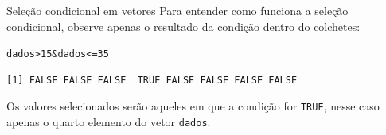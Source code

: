 \documentclass[10pt,handout]{beamer}\usepackage[]{graphicx}\usepackage[]{color}
\makeatletter
\newcommand{\hlnum}[1]{\textcolor[rgb]{0.686,0.059,0.569}{#1}}%
\newcommand{\hlopt}[1]{\textcolor[rgb]{0,0,0}{#1}}%
\newcommand{\hlstd}[1]{\textcolor[rgb]{0.345,0.345,0.345}{#1}}%
\newenvironment{kframe}{%
 \def\at@end@of@kframe{}%
 \ifinner\ifhmode%
  \def\at@end@of@kframe{\end{minipage}}%
  \begin{minipage}{\columnwidth}%
 \fi\fi%
 \def\FrameCommand##1{\hskip\@totalleftmargin \hskip-\fboxsep
 \colorbox{shadecolor}{##1}\hskip-\fboxsep
     \hskip-\linewidth \hskip-\@totalleftmargin \hskip\columnwidth}%
 \MakeFramed {\advance\hsize-\width
   \@totalleftmargin\z@ \linewidth\hsize
   \@setminipage}}%
 {\par\unskip\endMakeFramed%
 \at@end@of@kframe}
\newenvironment{knitrout}{}{} %
\makeatother
\begin{document}
\begin{frame}[fragile]{Seleção condicional em vetores}
Para entender como funciona a seleção condicional, observe apenas o
resultado da condição dentro do colchetes:
\begin{knitrout}\small
{}\color{fgcolor}\begin{kframe}
\begin{alltt}
\hlstd{dados} \hlopt{>} \hlnum{15} \hlopt{&} \hlstd{dados} \hlopt{<=} \hlnum{35}
\end{alltt}
\begin{verbatim}
[1] FALSE FALSE FALSE  TRUE FALSE FALSE FALSE FALSE
\end{verbatim}
\end{kframe}
\end{knitrout}

Os valores selecionados serão aqueles em que a condição for
\texttt{TRUE}, nesse caso apenas o quarto elemento do vetor
\texttt{dados}.
\end{frame}
\end{document}
